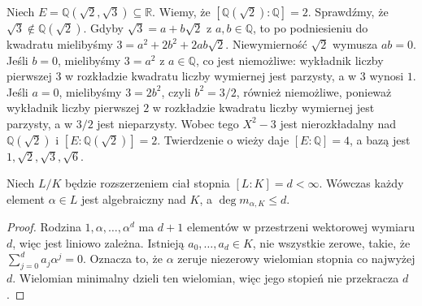 \begin{przyklad}
\label{aa:prz:biquadratic-extension}
Niech $E=\mathbb Q(\sqrt2,\sqrt3)\subseteq\mathbb R$.
Wiemy, że $[\mathbb Q(\sqrt2):\mathbb Q]=2$.
Sprawdźmy, że $\sqrt3\notin\mathbb Q(\sqrt2)$.
Gdyby $\sqrt3=a+b\sqrt2$ z $a,b\in\mathbb Q$,
to po podniesieniu do kwadratu mielibyśmy
$3=a^2+2b^2+2ab\sqrt2$. Niewymierność $\sqrt2$
wymusza $ab=0$. Jeśli $b=0$, mielibyśmy
$3=a^2$ z $a\in\mathbb Q$, co jest niemożliwe:
wykładnik liczby pierwszej $3$ w rozkładzie kwadratu
liczby wymiernej jest parzysty, a w $3$ wynosi $1$.
Jeśli $a=0$, mielibyśmy $3=2b^2$, czyli
$b^2=3/2$, również niemożliwe, ponieważ
wykładnik liczby pierwszej $2$ w rozkładzie
kwadratu liczby wymiernej jest parzysty,
a w $3/2$ jest nieparzysty.
Wobec tego $X^2-3$ jest nierozkładalny nad
$\mathbb Q(\sqrt2)$ i
$[E:\mathbb Q(\sqrt2)]=2$.
Twierdzenie o wieży daje $[E:\mathbb Q]=4$,
a bazą jest $1,\sqrt2,\sqrt3,\sqrt6$.
\end{przyklad}

\begin{stwierdzenie}
\label{aa:st:finite-implies-algebraic}
Niech $L/K$ będzie rozszerzeniem ciał stopnia
$[L:K]=d<\infty$. Wówczas każdy element $\alpha\in L$
jest algebraiczny nad $K$, a
$\deg m_{\alpha,K}\le d$.
\end{stwierdzenie}
\begin{proof}
Rodzina $1,\alpha,\ldots,\alpha^d$ ma $d+1$
elementów w przestrzeni wektorowej wymiaru $d$,
więc jest liniowo zależna. Istnieją
$a_0,\dots,a_d\in K$, nie wszystkie zerowe,
takie, że $\sum_{j=0}^d a_j\alpha^j=0$.
Oznacza to, że $\alpha$ zeruje niezerowy wielomian
stopnia co najwyżej $d$. Wielomian minimalny dzieli
ten wielomian, więc jego stopień nie przekracza $d$.
\end{proof}

